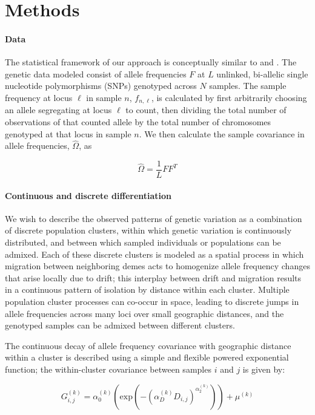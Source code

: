 \documentclass[12pt]{article}
\begin{document}
\section*{Methods}
\paragraph{Data}
The statistical framework of our approach is conceptually similar to \cite{Wasser2004} and \cite{spacemix}.
The genetic data modeled consist of allele frequencies $F$ at $L$ unlinked, bi-allelic single nucleotide polymorphisms (SNPs) genotyped across $N$ samples.
The sample frequency at locus $\ell$ in sample $n$, $f_{n,\ell}$, is calculated by first arbitrarily choosing an allele segregating 
at locus $\ell$ to count, 
then dividing the total number of observations of that counted allele by the total number of chromosomes genotyped at that locus
in sample $n$.
We then calculate the sample covariance in allele frequencies, $\widehat{\Omega}$, as

\begin{equation}
\widehat{\Omega} = \frac{1}{L}  FF^T
\label{sample_covariance}
\end{equation}

\paragraph{Continuous and discrete differentiation}
We wish to describe the observed patterns of genetic variation as a combination of 
discrete population clusters,
within which genetic variation is continuously distributed, 
and between which sampled individuals or populations can be admixed.
Each of these discrete clusters is modeled as a spatial process
in which migration between neighboring demes acts 
to homogenize allele frequency changes that arise locally due to drift;
this interplay between drift and migration 
results in a continuous pattern of isolation by distance within each cluster.
Multiple population cluster processes can co-occur in space, 
leading to discrete jumps in allele frequencies across many loci over small geographic distances,
and the genotyped samples can be admixed between different clusters.

The continuous decay of allele frequency covariance with geographic distance 
within a cluster is described using a simple and flexible powered exponential function;
the within-cluster covariance between samples $i$ and $j$ is given by:

\begin{equation}
G^{(k)}_{i,j} = \alpha^{(k)}_0 \left( \text{exp} \left( -(\alpha^{(k)}_D D_{i,j}) ^ {\alpha^{(k)}_2}	\right) \right) + \mu^{(k)}
\label{within_cluster_covariance}
\end{equation}
\end{document}
